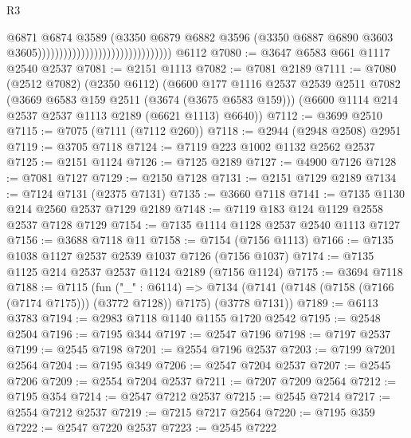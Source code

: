 \begin{lexlean}{R3}
\begin{coremodule}
                                                              @6871
                                                              @6874
                                                              @3589
                                                              (@3350
                                                                @6879
                                                                @6882
                                                                @3596
                                                                (@3350
                                                                  @6887
                                                                  @6890
                                                                  @3603
                                                                  @3605)))))))))))))))))))))))))))))))
    @6112
@7080 := @3647 @6583 @661 @1117 @2540 @2537
@7081 := @2151 @1113
@7082 := @7081 @2189
@7111 := @7080
    (@2512 @7082)
    (@2350 @6112)
    (@6600
      @177
      @1116
      @2537
      @2539
      @2511
      @7082
      (@3669 @6583 @159 @2511 (@3674 (@3675 @6583 @159)))
      (@6600 @1114 @214 @2537 @2537 @1113 @2189 (@6621 @1113) @6640))
@7112 := @3699 @2510
@7115 := @7075 (@7111 (@7112 @260))
@7118 := @2944 (@2948 @2508) @2951
@7119 := @3705 @7118
@7124 := @7119 @223 @1002 @1132 @2562 @2537
@7125 := @2151 @1124
@7126 := @7125 @2189
@7127 := @4900 @7126
@7128 := @7081 @7127
@7129 := @2150 @7128
@7131 := @2151 @7129 @2189
@7134 := @7124 @7131 (@2375 @7131)
@7135 := @3660 @7118
@7141 := @7135 @1130 @214 @2560 @2537 @7129 @2189
@7148 := @7119 @183 @124 @1129 @2558 @2537 @7128 @7129
@7154 := @7135 @1114 @1128 @2537 @2540 @1113 @7127
@7156 := @3688 @7118 @11
@7158 := @7154 (@7156 @1113)
@7166 := @7135 @1038 @1127 @2537 @2539 @1037 @7126 (@7156 @1037)
@7174 := @7135 @1125 @214 @2537 @2537 @1124 @2189 (@7156 @1124)
@7175 := @3694 @7118
@7188 := @7115
    (fun ("_" : @6114) =>
    @7134 (@7141 (@7148 (@7158 (@7166 (@7174 @7175))) (@3772 @7128)) @7175) (@3778 @7131))
@7189 := @6113 @3783
@7194 := @2983 @7118 @1140 @1155 @1720 @2542
@7195 := @2548 @2504
@7196 := @7195 @344
@7197 := @2547 @7196
@7198 := @7197 @2537
@7199 := @2545 @7198
@7201 := @2554 @7196 @2537
@7203 := @7199 @7201 @2564
@7204 := @7195 @349
@7206 := @2547 @7204 @2537
@7207 := @2545 @7206
@7209 := @2554 @7204 @2537
@7211 := @7207 @7209 @2564
@7212 := @7195 @354
@7214 := @2547 @7212 @2537
@7215 := @2545 @7214
@7217 := @2554 @7212 @2537
@7219 := @7215 @7217 @2564
@7220 := @7195 @359
@7222 := @2547 @7220 @2537
@7223 := @2545 @7222

\end{coremodule}
\end{lexlean}

